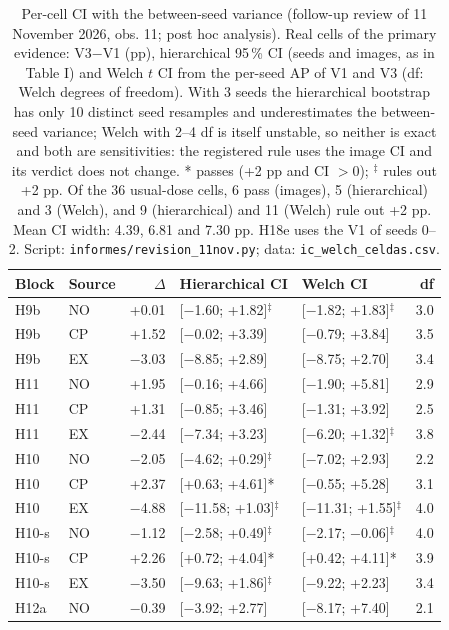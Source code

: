 \begin{table}[H]\centering\footnotesize
\caption{Per-cell CI with the between-seed variance (follow-up review of 11 November 2026, obs. 11; post hoc analysis). Real cells of the primary evidence: V3$-$V1 (pp), hierarchical 95\,\% CI (seeds and images, as in Table I) and Welch $t$ CI from the per-seed AP of V1 and V3 (df: Welch degrees of freedom). With 3 seeds the hierarchical bootstrap has only 10 distinct seed resamples and underestimates the between-seed variance; Welch with 2--4 df is itself unstable, so neither is exact and both are sensitivities: the registered rule uses the image CI and its verdict does not change. * passes (+2 pp and CI $>0$); $^\ddagger$ rules out +2 pp. Of the 36 usual-dose cells, 6 pass (images), 5 (hierarchical) and 3 (Welch), and 9 (hierarchical) and 11 (Welch) rule out +2 pp. Mean CI width: 4.39, 6.81 and 7.30 pp. H18e uses the V1 of seeds 0--2. Script: \texttt{informes/revision\_11nov.py}; data: \texttt{ic\_welch\_celdas.csv}.}\label{tab:s-welch}
\begin{tabular}{@{}llrllr@{}}\toprule
Block & Source & $\Delta$ & Hierarchical CI & Welch CI & df \\\midrule
H9b & NO & +0.01 & [$-$1.60; +1.82]$^\ddagger$ & [$-$1.82; +1.83]$^\ddagger$ & 3.0 \\
H9b & CP & +1.52 & [$-$0.02; +3.39] & [$-$0.79; +3.84] & 3.5 \\
H9b & EX & $-$3.03 & [$-$8.85; +2.89] & [$-$8.75; +2.70] & 3.4 \\
H11 & NO & +1.95 & [$-$0.16; +4.66] & [$-$1.90; +5.81] & 2.9 \\
H11 & CP & +1.31 & [$-$0.85; +3.46] & [$-$1.31; +3.92] & 2.5 \\
H11 & EX & $-$2.44 & [$-$7.34; +3.23] & [$-$6.20; +1.32]$^\ddagger$ & 3.8 \\
H10 & NO & $-$2.05 & [$-$4.62; +0.29]$^\ddagger$ & [$-$7.02; +2.93] & 2.2 \\
H10 & CP & +2.37 & [+0.63; +4.61]* & [$-$0.55; +5.28] & 3.1 \\
H10 & EX & $-$4.88 & [$-$11.58; +1.03]$^\ddagger$ & [$-$11.31; +1.55]$^\ddagger$ & 4.0 \\
H10-s & NO & $-$1.12 & [$-$2.58; +0.49]$^\ddagger$ & [$-$2.17; $-$0.06]$^\ddagger$ & 4.0 \\
H10-s & CP & +2.26 & [+0.72; +4.04]* & [+0.42; +4.11]* & 3.9 \\
H10-s & EX & $-$3.50 & [$-$9.63; +1.86]$^\ddagger$ & [$-$9.22; +2.23] & 3.4 \\
H12a & NO & $-$0.39 & [$-$3.92; +2.77] & [$-$8.17; +7.40] & 2.1 \\

\end{tabular}
\end{table}
